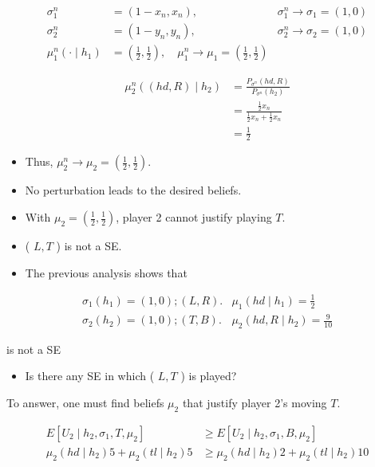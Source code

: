 \documentclass[10pt]{article}
\begin{document}
$$
\begin{array}{rlrl}
\sigma_{1}^{n} & =\left(1-x_{n}, x_{n}\right), & \sigma_{1}^{n} \rightarrow \sigma_{1}=(1,0) \\
\sigma_{2}^{n} & =\left(1-y_{n}, y_{n}\right), & \sigma_{2}^{n} \rightarrow \sigma_{2}=(1,0) \\
\mu_{1}^{n}\left(\cdot \mid h_{1}\right) & =\left(\frac{1}{2}, \frac{1}{2}\right), \quad \mu_{1}^{n} \rightarrow \mu_{1}=\left(\frac{1}{2}, \frac{1}{2}\right)
\end{array}
$$

$$
\begin{aligned}
\mu_{2}^{n}\left((h d, R) \mid h_{2}\right) & =\frac{P_{\sigma^{n}}(h d, R)}{P_{\sigma^{n}}\left(h_{2}\right)} \\
& =\frac{\frac{1}{2} x_{n}}{\frac{1}{2} x_{n}+\frac{1}{2} x_{n}} \\
& =\frac{1}{2}
\end{aligned}
$$

\begin{itemize}
  \item Thus, $\mu_{2}^{n} \rightarrow \mu_{2}=\left(\frac{1}{2}, \frac{1}{2}\right)$.
  \item No perturbation leads to the desired beliefs.
  \item With $\mu_{2}=\left(\frac{1}{2}, \frac{1}{2}\right)$, player 2 cannot justify playing $T$.
  \item ( $L, T$ ) is not a SE.
  \item The previous analysis shows that
\end{itemize}

$$
\begin{array}{ll}
\sigma_{1}\left(h_{1}\right)=(1,0) ;(L, R) . & \mu_{1}\left(h d \mid h_{1}\right)=\frac{1}{2} \\
\sigma_{2}\left(h_{2}\right)=(1,0) ;(T, B) . & \mu_{2}\left(h d, R \mid h_{2}\right)=\frac{9}{10}
\end{array}
$$

is not a SE

\begin{itemize}
  \item Is there any SE in which ( $L, T$ ) is played?
\end{itemize}

To answer, one must find beliefs $\mu_{2}$ that justify player 2's moving $T$.

$$
\begin{aligned}
E\left[U_{2} \mid h_{2}, \sigma_{1}, T, \mu_{2}\right] & \geq E\left[U_{2} \mid h_{2}, \sigma_{1}, B, \mu_{2}\right] \\
\mu_{2}\left(h d \mid h_{2}\right) 5+\mu_{2}\left(t l \mid h_{2}\right) 5 & \geq \mu_{2}\left(h d \mid h_{2}\right) 2+\mu_{2}\left(t l \mid h_{2}\right) 10
\end{aligned}
$$
\end{document}
